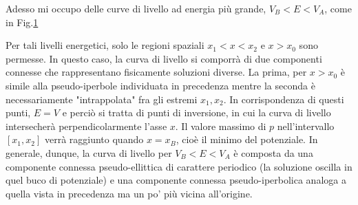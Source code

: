 \documentclass[a4paper,openany]{article}
\begin{document}
	Adesso mi occupo delle curve di livello ad energia più grande, $V_{B} < E < V_{A}$, come in Fig.\ref{Fig3}
	\begin{figure}[H]
		\centering
		\label{Fig3}
	\end{figure}
	
	Per tali livelli energetici, solo le regioni spaziali $x_{1} < x < x_{2}$ e $x>x_{0}$ sono permesse. In questo caso, la curva di livello si comporrà di due componenti connesse che rappresentano fisicamente soluzioni diverse. La prima, per $x>x_{0}$ è simile alla pseudo-iperbole individuata in precedenza mentre la seconda è necessariamente "intrappolata" fra gli estremi $x_{1}, x_{2}$. In corrispondenza di questi punti, $E=V$ e perciò si tratta di punti di inversione, in cui la curva di livello intersecherà perpendicolarmente l'asse $x$. Il valore massimo di $p$ nell'intervallo $ [x_{1},x_{2}]$ verrà raggiunto quando $x=x_{B}$, cioè il minimo del potenziale. In generale, dunque, la curva di livello per $V_B < E < V_A$ è composta da una componente connessa pseudo-ellittica di carattere periodico (la soluzione oscilla in quel buco di potenziale) e una componente connessa pseudo-iperbolica analoga a quella vista in precedenza ma un po' più vicina all'origine.
	
\end{document}
